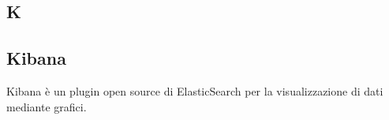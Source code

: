 \subsection*{K}

    \subsection*{Kibana}

        Kibana è un plugin open source di ElasticSearch per la visualizzazione di dati mediante grafici.